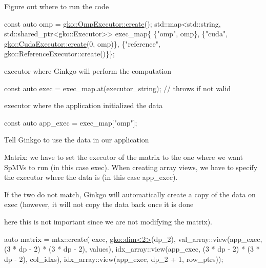 {\ttfamily  Figure out where to run the code}

{\ttfamily 
\begin{DoxyCode}
\textcolor{keyword}{const} \textcolor{keyword}{auto} omp = \hyperlink{classgko_1_1OmpExecutor_a33ca05fdd0fc928ee262fc9425304874}{gko::OmpExecutor::create}();
std::map<std::string, std::shared\_ptr<gko::Executor>> exec\_map\{
    \{\textcolor{stringliteral}{"omp"}, omp\},
    \{\textcolor{stringliteral}{"cuda"}, \hyperlink{classgko_1_1CudaExecutor_a2718a92034350650ef406ffdb60db090}{gko::CudaExecutor::create}(0, omp)\},
    \{\textcolor{stringliteral}{"reference"}, gko::ReferenceExecutor::create()\}\};
\end{DoxyCode}
}

{\ttfamily  executor where Ginkgo will perform the computation}

{\ttfamily 
\begin{DoxyCode}
\textcolor{keyword}{const} \textcolor{keyword}{auto} exec = exec\_map.at(executor\_string);  \textcolor{comment}{// throws if not valid}
\end{DoxyCode}
}

{\ttfamily  executor where the application initialized the data}

{\ttfamily 
\begin{DoxyCode}
\textcolor{keyword}{const} \textcolor{keyword}{auto} app\_exec = exec\_map[\textcolor{stringliteral}{"omp"}];
\end{DoxyCode}
}

{\ttfamily  Tell Ginkgo to use the data in our application}

{\ttfamily  Matrix\+: we have to set the executor of the matrix to the one where we want Sp\+M\+Vs to run (in this case {\ttfamily exec}). When creating array views, we have to specify the executor where the data is (in this case {\ttfamily app\+\_\+exec}).}

{\ttfamily  If the two do not match, Ginkgo will automatically create a copy of the data on {\ttfamily exec} (however, it will not copy the data back once it is done
\begin{DoxyItemize}
\item here this is not important since we are not modifying the matrix).
\end{DoxyItemize}}

{\ttfamily 
\begin{DoxyCode}
\textcolor{keyword}{auto} matrix = mtx::create(
    exec, \hyperlink{structgko_1_1dim}{gko::dim<2>}(dp\_2),
    val\_array::view(app\_exec, (3 * dp - 2) * (3 * dp - 2), values),
    idx\_array::view(app\_exec, (3 * dp - 2) * (3 * dp - 2), col\_idxs),
    idx\_array::view(app\_exec, dp\_2 + 1, row\_ptrs));
\end{DoxyCode}
}

